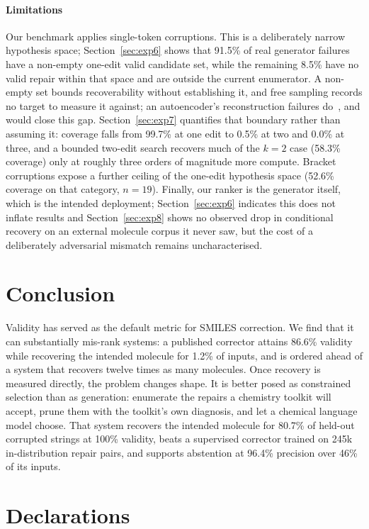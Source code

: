 \documentclass[conference]{IEEEtran}
\begin{document}
\paragraph{Limitations}
Our benchmark applies single-token corruptions. This is a deliberately narrow
hypothesis space; Section~\ref{sec:exp6} shows that 91.5\% of real generator
failures have a non-empty one-edit valid candidate set, while the remaining
8.5\% have no valid repair within that space and are outside the current
enumerator. A non-empty set bounds recoverability without establishing it,
and free sampling records no target to measure it against; an autoencoder's
reconstruction failures do~\citep{park2026chemfixer}, and would close this gap. Section~\ref{sec:exp7}
quantifies that boundary rather than assuming it: coverage falls from 99.7\% at
one edit to 0.5\% at two and 0.0\% at three, and a bounded two-edit search
recovers much of the $k{=}2$ case (58.3\% coverage) only at roughly three orders
of magnitude more compute. Bracket corruptions expose a further ceiling of the
one-edit hypothesis space (52.6\% coverage on that category, $n=19$). Finally,
our ranker is the generator itself, which is the intended deployment;
Section~\ref{sec:exp6} indicates this does not inflate results and
Section~\ref{sec:exp8} shows no observed drop in conditional recovery on an
external molecule corpus it never saw, but the cost of a deliberately
adversarial mismatch remains uncharacterised.

\section{Conclusion}

Validity has served as the default metric for SMILES correction. We find that
it can substantially mis-rank systems: a published corrector attains 86.6\% validity
while recovering the intended molecule for 1.2\% of inputs, and is ordered ahead
of a system that recovers twelve times as many molecules. Once recovery is
measured directly, the problem changes shape. It is better posed as constrained
selection than as generation: enumerate the repairs a chemistry toolkit will
accept, prune them with the toolkit's own diagnosis, and let a chemical language
model choose. That system recovers the intended molecule for 80.7\% of held-out
corrupted strings at 100\% validity, beats a supervised corrector trained on
245k in-distribution repair pairs, and supports abstention at 96.4\% precision
over 46\% of its inputs.


\section*{Declarations}
\end{document}
